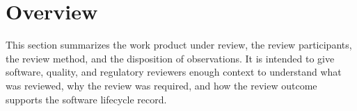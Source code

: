 \section{Overview}
This section summarizes the work product under review, the review participants,
the review method, and the disposition of observations.  It is intended to give
software, quality, and regulatory reviewers enough context to understand what was
reviewed, why the review was required, and how the review outcome supports the
software lifecycle record.
